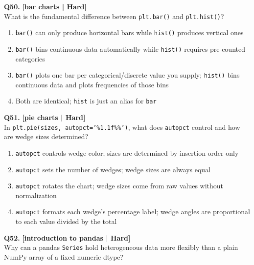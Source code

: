 \noindent\textbf{Q50.} \hfill {\small\color{LPUOrange}\textbf{[bar charts | Hard]}}\\[2pt]
What is the fundamental difference between \texttt{plt.bar()} and \texttt{plt.hist()}?

\begin{enumerate}[label=(\alph*),topsep=2pt,itemsep=1pt,partopsep=0pt,parsep=0pt]
    \item \relax \texttt{bar()} can only produce horizontal bars while \texttt{hist()} produces vertical ones
    \item \relax \texttt{bar()} bins continuous data automatically while \texttt{hist()} requires pre-counted categories
    \item \relax \texttt{bar()} plots one bar per categorical/discrete value you supply; \texttt{hist()} bins continuous data and plots frequencies of those bins
    \item \relax Both are identical; \texttt{hist} is just an alias for \texttt{bar}
\end{enumerate}
\vspace{2mm}

\noindent\textbf{Q51.} \hfill {\small\color{LPUOrange}\textbf{[pie charts | Hard]}}\\[2pt]
In \texttt{plt.pie(sizes, autopct='\%1.1f\%\%')}, what does \texttt{autopct} control and how are wedge sizes determined?

\begin{enumerate}[label=(\alph*),topsep=2pt,itemsep=1pt,partopsep=0pt,parsep=0pt]
    \item \relax \texttt{autopct} controls wedge color; sizes are determined by insertion order only
    \item \relax \texttt{autopct} sets the number of wedges; wedge sizes are always equal
    \item \relax \texttt{autopct} rotates the chart; wedge sizes come from raw values without normalization
    \item \relax \texttt{autopct} formats each wedge's percentage label; wedge angles are proportional to each value divided by the total
\end{enumerate}
\vspace{2mm}

\noindent\textbf{Q52.} \hfill {\small\color{LPUOrange}\textbf{[introduction to pandas | Hard]}}\\[2pt]
Why can a pandas \texttt{Series} hold heterogeneous data more flexibly than a plain NumPy array of a fixed numeric dtype?

